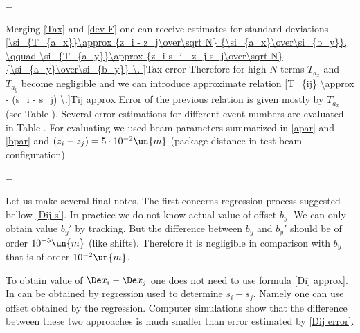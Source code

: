 {\setbox\strutbox=\hbox{\vrule height12pt depth4pt width0pt}
}

Merging \equs{} \ref{Tax} and \ref{dev F} one can receive estimates for standard deviations
\eqref{\si_{T_{a_x}}\approx {z_i - z_j\over\sqrt N} {\si_{a_x}\over\si_{b_y}},
\qquad \si_{T_{a_y}}\approx {z_i s_i - z_j s_j\over\sqrt N} {\si_{a_y}\over\si_{b_y}} \. }{Tax error}
Therefore for high $N$ terms $T_{a_x}$ and $T_{a_y}$ become negligible and we can introduce
approximate relation
\eqref{T_{ij} \approx - (s_i - s_j) \.}{Tij approx}
Error of the previous relation is given mostly by $T_{a_x}$ (see Table ). Several error estimations
for different event numbers are evaluated in Table . For evaluating we used beam parameters
summarized in \ref{apar} and \ref{bpar} and $(z_i - z_j) = 5\cdot 10^{-2}\un{m}$ (package distance
in test beam configuration).

{\setbox\strutbox=\hbox{\vrule height12pt depth4pt width0pt}
}

Let us make several final notes. The first concerns regression process suggested bellow \equ{} \ref{Dij sl}.
In practice we do not know actual value of offset $b_y$. We can only obtain value $b_y'$ by tracking. But
the difference between $b_y$ and $b_y'$ should be of order $10^{-5}\un{m}$ (like shifts). Therefore it is
negligible in comparison with $b_y$ that is of order $10^{-2}\un{m}$.

To obtain value of $\De x_i - \De x_j$ one does not need to use formula \ref{Dij approx}. In can be obtained by regression used to determine $s_i - s_j$. Namely one can use offset obtained by the regression. Computer simulations show that the difference between these two approaches is much smaller than error estimated by \equ{} \ref{Dij error}.

